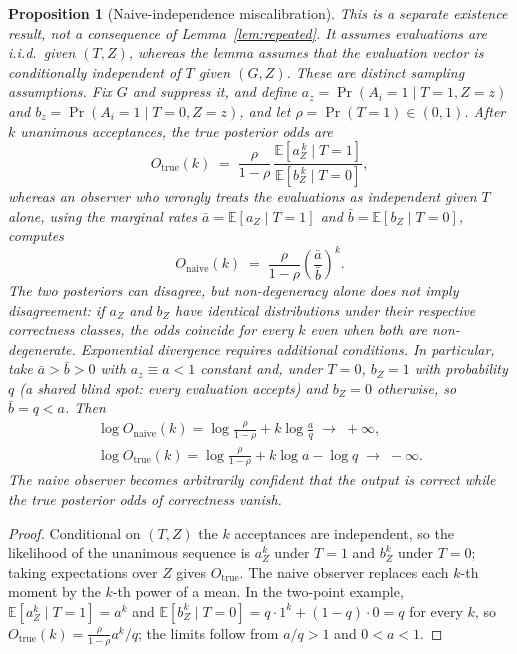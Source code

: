 \documentclass[a4paper,journal]{IAENGtran}
\newtheorem{Proposition}[Theorem]{Proposition}
\begin{document}
\begin{Proposition}[Naive-independence miscalibration]
\label{prop:miscalibration}
This is a separate existence result, not a consequence of Lemma~\ref{lem:repeated}.
It assumes evaluations are i.i.d.\ given $(T,Z)$, whereas the lemma assumes that the
evaluation vector is conditionally independent of $T$ given $(G,Z)$. These are distinct
sampling assumptions. Fix $G$ and suppress it, and define
$a_z = \Pr(A_i{=}1 \mid T{=}1, Z{=}z)$ and $b_z = \Pr(A_i{=}1 \mid T{=}0, Z{=}z)$,
and let $\rho = \Pr(T{=}1) \in (0,1)$. After $k$ unanimous acceptances, the true
posterior odds are
\[
O_{\mathrm{true}}(k) \;=\; \frac{\rho}{1-\rho}\,
\frac{\mathbb{E}[a_Z^{\,k} \mid T{=}1]}{\mathbb{E}[b_Z^{\,k} \mid T{=}0]},
\]
whereas an observer who wrongly treats the evaluations as independent given $T$
alone, using the marginal rates $\bar a = \mathbb{E}[a_Z \mid T{=}1]$ and
$\bar b = \mathbb{E}[b_Z \mid T{=}0]$, computes
\[
O_{\mathrm{naive}}(k) \;=\; \frac{\rho}{1-\rho}\left(\frac{\bar a}{\bar b}\right)^{k}.
\]
The two posteriors can disagree, but non-degeneracy alone does not imply disagreement:
if $a_Z$ and $b_Z$ have identical distributions under their respective correctness
classes, the odds coincide for every $k$ even when both are non-degenerate. Exponential divergence requires additional
conditions. In particular, take $\bar a > \bar b > 0$ with
$a_z \equiv a < 1$ constant and, under $T{=}0$, $b_Z = 1$ with probability $q$ (a
shared blind spot: every evaluation accepts) and $b_Z = 0$ otherwise, so
$\bar b = q < a$. Then
\begin{gather*}
\log O_{\mathrm{naive}}(k) = \log\tfrac{\rho}{1-\rho} + k\log\tfrac{a}{q}
\;\longrightarrow\; +\infty, \\
\log O_{\mathrm{true}}(k) = \log\tfrac{\rho}{1-\rho} + k\log a - \log q
\;\longrightarrow\; -\infty .
\end{gather*}
The naive observer becomes arbitrarily confident that the output is correct while
the true posterior odds of correctness vanish.
\end{Proposition}

\begin{proof}
Conditional on $(T,Z)$ the $k$ acceptances are independent, so the likelihood of the
unanimous sequence is $a_Z^k$ under $T{=}1$ and $b_Z^k$ under $T{=}0$; taking
expectations over $Z$ gives $O_{\mathrm{true}}$. The naive observer replaces each
$k$-th moment by the $k$-th power of a mean. In the two-point example,
$\mathbb{E}[a_Z^k \mid T{=}1] = a^k$ and
$\mathbb{E}[b_Z^k \mid T{=}0] = q\cdot 1^k + (1-q)\cdot 0 = q$ for every $k$, so
$O_{\mathrm{true}}(k) = \frac{\rho}{1-\rho} a^k / q$; the limits follow from
$a/q > 1$ and $0 < a < 1$.
\end{proof}
\end{document}

